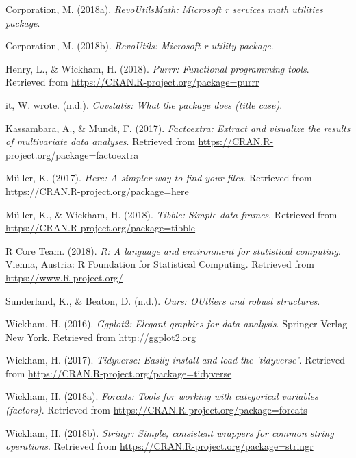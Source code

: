 \documentclass[man,floatsintext]{apa6}
\theoremstyle{definition}
\theoremstyle{definition}
\theoremstyle{definition}
\theoremstyle{remark}
\begin{document}
\leavevmode\hypertarget{ref-R-RevoUtilsMath}{}%
Corporation, M. (2018a). \emph{RevoUtilsMath: Microsoft r services math
utilities package}.

\leavevmode\hypertarget{ref-R-RevoUtils}{}%
Corporation, M. (2018b). \emph{RevoUtils: Microsoft r utility package}.

\leavevmode\hypertarget{ref-R-purrr}{}%
Henry, L., \& Wickham, H. (2018). \emph{Purrr: Functional programming
tools}. Retrieved from \url{https://CRAN.R-project.org/package=purrr}

\leavevmode\hypertarget{ref-R-covstatis}{}%
it, W. wrote. (n.d.). \emph{Covstatis: What the package does (title
case)}.

\leavevmode\hypertarget{ref-R-factoextra}{}%
Kassambara, A., \& Mundt, F. (2017). \emph{Factoextra: Extract and
visualize the results of multivariate data analyses}. Retrieved from
\url{https://CRAN.R-project.org/package=factoextra}

\leavevmode\hypertarget{ref-R-here}{}%
Müller, K. (2017). \emph{Here: A simpler way to find your files}.
Retrieved from \url{https://CRAN.R-project.org/package=here}

\leavevmode\hypertarget{ref-R-tibble}{}%
Müller, K., \& Wickham, H. (2018). \emph{Tibble: Simple data frames}.
Retrieved from \url{https://CRAN.R-project.org/package=tibble}

\leavevmode\hypertarget{ref-R-base}{}%
R Core Team. (2018). \emph{R: A language and environment for statistical
computing}. Vienna, Austria: R Foundation for Statistical Computing.
Retrieved from \url{https://www.R-project.org/}

\leavevmode\hypertarget{ref-R-ours}{}%
Sunderland, K., \& Beaton, D. (n.d.). \emph{Ours: OUtliers and robust
structures}.

\leavevmode\hypertarget{ref-R-ggplot2}{}%
Wickham, H. (2016). \emph{Ggplot2: Elegant graphics for data analysis}.
Springer-Verlag New York. Retrieved from \url{http://ggplot2.org}

\leavevmode\hypertarget{ref-R-tidyverse}{}%
Wickham, H. (2017). \emph{Tidyverse: Easily install and load the
'tidyverse'}. Retrieved from
\url{https://CRAN.R-project.org/package=tidyverse}

\leavevmode\hypertarget{ref-R-forcats}{}%
Wickham, H. (2018a). \emph{Forcats: Tools for working with categorical
variables (factors)}. Retrieved from
\url{https://CRAN.R-project.org/package=forcats}

\leavevmode\hypertarget{ref-R-stringr}{}%
Wickham, H. (2018b). \emph{Stringr: Simple, consistent wrappers for
common string operations}. Retrieved from
\url{https://CRAN.R-project.org/package=stringr}
\end{document}
